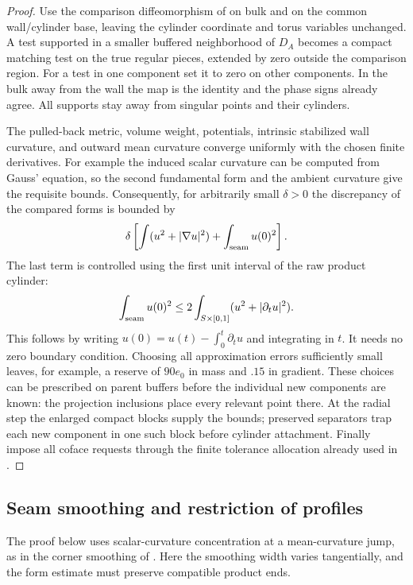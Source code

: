 \begin{proof}
Use the comparison diffeomorphism of  on bulk
and on the common wall/cylinder base, leaving the cylinder coordinate
and torus variables unchanged.  A test supported in a smaller buffered
neighborhood of $D_A$ becomes a compact matching test on the true
regular pieces, extended by zero outside the comparison region.  For
a test in one component set it to zero on other components.  In the
bulk away from the wall the map is the identity and the phase signs
already agree.  All supports stay away from singular points and their
cylinders.

The pulled-back metric, volume weight, potentials, intrinsic stabilized
wall curvature, and outward mean curvature converge uniformly with the
chosen finite derivatives.  For example the induced scalar curvature
can be computed from Gauss' equation, so the second fundamental form
and the ambient curvature give the requisite bounds.  Consequently,
for arbitrarily small $\delta>0$ the discrepancy of the compared forms
is bounded by
\[
 \delta\left[\int(u^2+|\nabla u|^2)+\int_{\rm seam}u(0)^2\right].
\]
The last term is controlled using the first unit interval of the raw
product cylinder:
\begin{equation}\label{regular:trace}
 \int_{\rm seam}u(0)^2
 \le 2\int_{S\times[0,1]}(u^2+|\partial_tu|^2).
\end{equation}
This follows by writing $u(0)=u(t)-\int_0^t\partial_tu$ and integrating
in $t$.  It needs no zero boundary condition.  Choosing all approximation
errors sufficiently small leaves, for example, a reserve of $90e_0$
in mass and $.15$ in gradient.  These choices can be prescribed on
parent buffers before the individual new components are known: the
projection inclusions place every relevant point there.  At the radial
step the enlarged compact blocks supply the bounds; preserved
separators trap each new component in one such block before cylinder
attachment.  Finally impose all coface requests through the finite
tolerance allocation already used in .
\end{proof}

\subsection{Seam smoothing and restriction of profiles}

The proof below uses scalar-curvature concentration at a mean-curvature
jump, as in the corner smoothing of
\citet[Sections~2--3]{miao2002Corners}.  Here the smoothing width varies
tangentially, and the form estimate must preserve compatible product ends.

